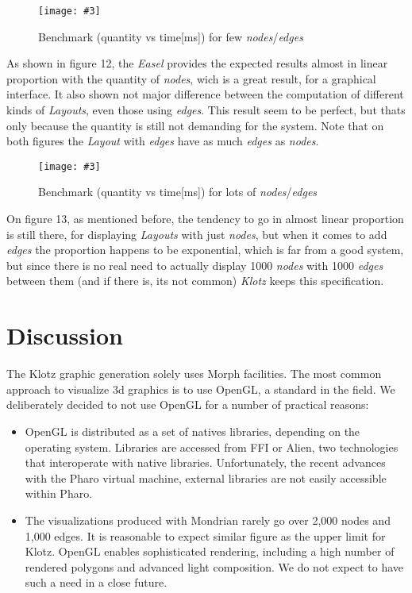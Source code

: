 \documentclass{sig-alternate}
\newcommand{\fig}[4]{
	\begin{figure}[#1]
		\centering
		\texttt{[image: \#3]}
		\caption{\label{fig:#3}#4}
	\end{figure}}
\newcommand{\seclabel}[1]{\label{sec:#1}}
\begin{document}
\fig{}{0.5}{graph1}{Benchmark (quantity vs time[ms]) for few \emph{nodes}/\emph{edges}} 

As shown in figure 12, the \emph{Easel} provides the expected results
almost in linear proportion with the quantity of \emph{nodes}, 
wich is a great result, for a graphical interface. It also shown 
not major difference between the computation of different kinds 
of \emph{Layouts}, even those using \emph{edges}. This result seem 
to be perfect, but thats only because the quantity is still not 
demanding for the system. Note that on both figures the \emph{Layout} 
with \emph{edges} have as much \emph{edges} as \emph{nodes}.  

\fig{}{0.5}{graph2}{Benchmark (quantity vs time[ms]) for lots of \emph{nodes}/\emph{edges}}

On figure 13, as mentioned before, the tendency to go in almost 
linear proportion is still there, for displaying \emph{Layouts} 
with just \emph{nodes}, but when it comes to add \emph{edges}
the proportion happens to be exponential, which is far from
a good system, but since there is no real need to actually 
display 1000 \emph{nodes} with 1000 \emph{edges} between them (and
if there is, its not common) \emph{Klotz} keeps this specification. 

\section{Discussion} \seclabel{discussion}

The Klotz graphic generation solely uses Morph facilities. The most common approach to visualize 3d graphics is to use OpenGL, a standard in the field. We deliberately decided to not use OpenGL for a number of practical reasons:

\begin{itemize}
\item OpenGL is distributed as a set of natives libraries, depending on the operating system. Libraries are accessed from FFI or Alien, two technologies that interoperate with native libraries. Unfortunately, the recent advances with the Pharo virtual machine, external libraries are not easily accessible within Pharo. 

\item The visualizations produced with Mondrian rarely go over 2,000 nodes and 1,000 edges. It is reasonable to expect similar figure as the upper limit for Klotz. OpenGL enables sophisticated rendering, including a high number of rendered polygons and advanced light composition. We do not expect to have such a need in a close future.
\end{itemize}
\end{document}
